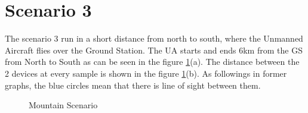 \section{Scenario 3}\label{sec:scenario3}
The scenario 3 run in a short distance from north to south, where the Unmanned Aircraft flies over the Ground Station. The UA starts and ends 6km from the GS from North to South as can be seen in the figure \ref{fig:s3_map}(a). The distance between the 2 devices at every sample is shown in the figure \ref{fig:s3_map}(b). As followings in former graphs, the blue circles mean that there is line of sight between them. 


\begin{figure}[H]
	\hfill
	\hfill
	\hfill
	\caption{Mountain Scenario}
	\label{fig:s3_map}
\end{figure}

